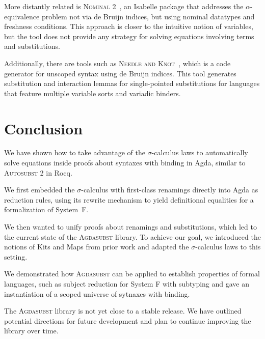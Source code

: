 \documentclass[screen,nonacm]{acmart}
\begin{document}
More distantly related is \textsc{Nominal 2}~\cite{Nominal2-AFP}, an Isabelle
package that addresses the $α$-equivalence problem not via de Bruijn indices,
but using nominal datatypes and freshness conditions. This approach is closer
to the intuitive notion of variables, but the tool does not provide any
strategy for solving equations involving terms and substitutions.

Additionally, there are tools such as \textsc{Needle and
      Knot}~\cite{10.1007/978-3-662-49498-1_17}, which is a code generator for
unscoped syntax using de Bruijn indices. This tool generates substitution and
interaction lemmas for single-pointed substitutions for languages that feature
multiple variable sorts and variadic binders.

\section{Conclusion}\label{sec:con}
We have shown how to take advantage of the $σ$-calculus laws to
automatically solve equations inside proofs about syntaxes with binding in Agda,
similar to \textsc{Autosubst 2} in Rocq.

We first embedded the $σ$-calculus with first-class renamings directly into
Agda as reduction rules, using its rewrite mechanism to yield definitional
equalities for a formalization of System~F.

We then wanted to unify proofs about renamings and substitutions, which led to
the current state of the \textsc{Agdasubst} library. To achieve our goal, we
introduced the notions of Kits and Maps from prior work and adapted the
$σ$-calculus laws to this setting.

We demonstrated how \textsc{Agdasubst} can be applied to establish properties
of formal languages, such as subject reduction for System F with subtyping and
gave an instantiation of a scoped universe of sytnaxes with binding.

The \textsc{Agdasubst} library is not yet close to a stable release. We have
outlined potential directions for future development and plan to continue
improving the library over time.



\end{document}
